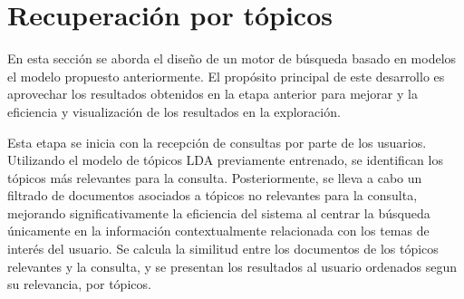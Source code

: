 \section{Recuperaci\'on por t\'opicos}

En esta sección se aborda el dise\~no de un motor de búsqueda basado en modelos el modelo propuesto anteriormente. El propósito principal de este desarrollo es aprovechar los resultados obtenidos en la etapa anterior para mejorar y la eficiencia y visualizaci\'on de los resultados en la exploraci\'on.

Esta etapa se inicia con la recepción de consultas por parte de los usuarios. Utilizando el modelo de tópicos LDA previamente entrenado, se identifican los tópicos más relevantes para la consulta. Posteriormente, se lleva a cabo un filtrado de documentos asociados a tópicos no relevantes para la consulta, mejorando significativamente la eficiencia del sistema al centrar la búsqueda únicamente en la información contextualmente relacionada con los temas de interés del usuario. Se calcula la similitud entre los documentos de los t\'opicos relevantes y la consulta, y se presentan los resultados al usuario ordenados segun su relevancia, por t\'opicos. 

